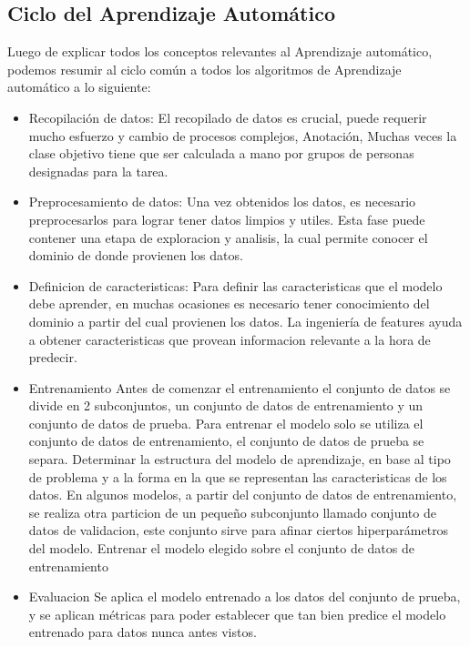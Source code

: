\documentclass[a4paper,11pt,spanish]{book}
\begin{document}
    \subsection{Ciclo del Aprendizaje Automático}
      Luego de explicar todos los conceptos relevantes al Aprendizaje automático, podemos resumir al ciclo común a todos los algoritmos de Aprendizaje automático a lo siguiente:
      \begin{itemize}
	\item Recopilación de datos:
	  El recopilado de datos es crucial, puede requerir mucho esfuerzo y cambio de procesos complejos,
	  Anotación, Muchas veces la clase objetivo tiene que ser calculada a mano por grupos de personas designadas para la tarea.
	\item Preprocesamiento de datos: Una vez obtenidos los datos, es necesario preprocesarlos para lograr tener datos limpios y utiles. Esta fase puede contener una etapa
	  de exploracion y analisis, la cual permite conocer el dominio de donde provienen los datos.
	\item Definicion de caracteristicas: Para definir las caracteristicas que el modelo debe aprender, en muchas ocasiones es necesario tener conocimiento del dominio a partir del cual provienen los datos.
	  La ingeniería de features ayuda a obtener caracteristicas que provean informacion relevante a la hora de predecir.
	\item Entrenamiento
	  \subitem Antes de comenzar el entrenamiento el conjunto de datos se divide en 2 subconjuntos, un conjunto de datos de entrenamiento y un conjunto de datos de prueba.
	  \subitem Para entrenar el modelo solo se utiliza el conjunto de datos de entrenamiento, el conjunto de datos de prueba se separa.
	  \subitem Determinar la estructura del modelo de aprendizaje, en base al tipo de problema y a la forma en la que se representan las caracteristicas de los datos.
	  \subitem En algunos modelos, a partir del conjunto de datos de entrenamiento, se realiza otra particion de un pequeño subconjunto llamado conjunto de datos de validacion, este conjunto sirve
	  para afinar ciertos hiperparámetros del modelo.
	  \subitem Entrenar el modelo elegido sobre el conjunto de datos de entrenamiento
	\item Evaluacion
	  Se aplica el modelo entrenado a los datos del conjunto de prueba, y se aplican métricas para poder establecer que tan bien predice el modelo entrenado para datos nunca antes vistos.
      \end{itemize}
\end{document}
